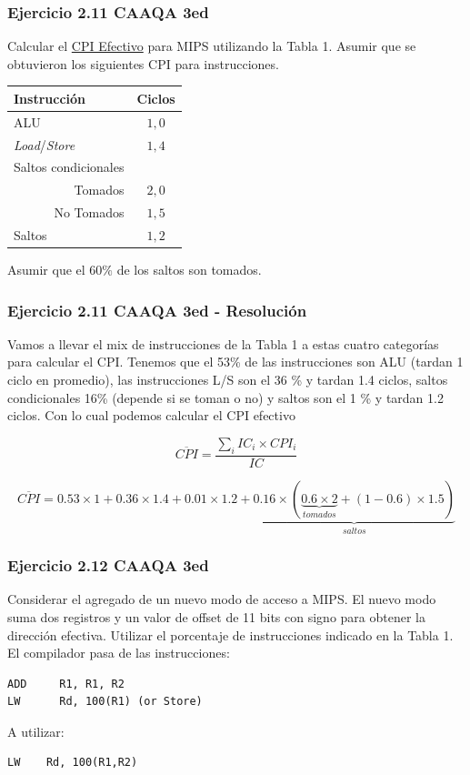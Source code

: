 \documentclass{beamer}
\begin{document}
\begin{frame}
 \frametitle{Ejercicio 2.11 CAAQA 3ed}
            Calcular el \underline{CPI Efectivo} para MIPS utilizando la Tabla 1. Asumir que se obtuvieron los siguientes CPI para instrucciones.

            \begin{center}
            \begin{tabular}{||l|c||}
            \hline
            Instrucción & Ciclos \\
            \hline
            ALU & $1,0$ \\\hline
            \textit{Load}/\textit{Store} & $1,4$ \\\hline
            Saltos condicionales & \\\hline
            \multicolumn{1}{||r|}{Tomados} & $2,0$ \\\hline
            \multicolumn{1}{||r|}{No Tomados} & $1,5$ \\\hline
            Saltos & $1,2$ \\\hline
            \end{tabular}
            \end{center}

            Asumir que el $60\%$ de los saltos son tomados.
 
\end{frame}

\begin{frame}
 \frametitle{Ejercicio 2.11 CAAQA 3ed - Resolución}
 Vamos a llevar el mix de instrucciones de la Tabla 1 a estas cuatro categorías para calcular el CPI. Tenemos que el 53\% de las instrucciones son ALU (tardan 1 ciclo en promedio), las instrucciones L/S son el 36 \% y tardan 1.4 ciclos, saltos condicionales 16\% (depende si se toman o no) y saltos son el 1 \% y tardan 1.2 ciclos. Con lo cual podemos calcular el CPI efectivo
 
 \[ \overline{CPI} = \frac{\sum_i IC_i \times CPI_i}{IC}\]
 
 \[ \overline{CPI} = 0.53 \times 1 + 0.36 \times 1.4 + 0.01 \times 1.2 + \underbrace{0.16 \times ( \underbrace{0.6 \times 2}_{tomados} + (1-0.6) \times 1.5)}_{saltos} \]

\end{frame}
\begin{frame}[fragile]
 \frametitle{Ejercicio 2.12 CAAQA 3ed}
 
 Considerar el agregado de un nuevo modo de acceso a MIPS. El nuevo modo suma dos registros y un valor de offset de 11 bits con signo para obtener la dirección efectiva. Utilizar el porcentaje de instrucciones indicado en la Tabla 1. El compilador pasa de las instrucciones: 
    
\begin{lstlisting}
ADD     R1, R1, R2
LW      Rd, 100(R1)	(or Store)
 \end{lstlisting}

A utilizar:
\begin{lstlisting}
LW    Rd, 100(R1,R2)
 \end{lstlisting}

\end{frame}
\end{document}
